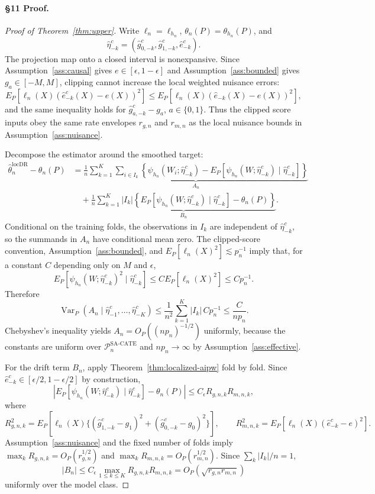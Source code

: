 \paragraph{\S11 Proof.}
\begin{proof}[Proof of Theorem~\ref{thm:upper}]
Write $\ell_n=\ell_{h_n}$, $\theta_n(P)=\theta_{h_n}(P)$, and
\[
  \hat\eta^c_{-k}=(\hat g^c_{0,-k},\hat g^c_{1,-k},\hat e^c_{-k}).
\]
The projection map onto a closed interval is nonexpansive.  Since Assumption~\ref{ass:causal} gives
$e\in[\epsilon,1-\epsilon]$ and Assumption~\ref{ass:bounded} gives $g_a\in[-M,M]$, clipping cannot
increase the local weighted nuisance errors:
\[
  E_P[\ell_n(X)(\hat e^c_{-k}(X)-e(X))^2]
  \le E_P[\ell_n(X)(\hat e_{-k}(X)-e(X))^2],
\]
and the same inequality holds for $\hat g^c_{a,-k}-g_a$, $a\in\{0,1\}$.  Thus the clipped score inputs
obey the same rate envelopes $r_{g,n}$ and $r_{m,n}$ as the local nuisance bounds in
Assumption~\ref{ass:nuisance}.

Decompose the estimator around the smoothed target:
\[
\begin{aligned}
  \hat\theta_n^{\mathrm{locDR}}-\theta_n(P)
  &=
  \underbrace{
  \frac{1}{n}\sum_{k=1}^K\sum_{i\in I_k}
  \left\{\psi_{h_n}(W_i;\hat\eta^c_{-k})
       -E_P[\psi_{h_n}(W;\hat\eta^c_{-k})\mid \hat\eta^c_{-k}]\right\}}_{A_n} \\
  &\quad+
  \underbrace{
  \frac{1}{n}\sum_{k=1}^K |I_k|
  \left\{E_P[\psi_{h_n}(W;\hat\eta^c_{-k})\mid \hat\eta^c_{-k}]-\theta_n(P)\right\}}_{B_n}.
\end{aligned}
\]
Conditional on the training folds, the observations in $I_k$ are independent of
$\hat\eta^c_{-k}$, so the summands in $A_n$ have conditional mean zero.  The clipped-score convention,
Assumption~\ref{ass:bounded}, and $E_P[\ell_n(X)^2]\lesssim p_n^{-1}$ imply that, for a constant $C$
depending only on $M$ and $\epsilon$,
\[
  E_P\!\left[\psi_{h_n}(W;\hat\eta^c_{-k})^2\mid \hat\eta^c_{-k}\right]
  \le C E_P[\ell_n(X)^2]
  \le C p_n^{-1}.
\]
Therefore
\[
  \operatorname{Var}_P(A_n\mid \hat\eta^c_{-1},\ldots,\hat\eta^c_{-K})
  \le
  \frac{1}{n^2}\sum_{k=1}^K |I_k|\,C p_n^{-1}
  \le \frac{C}{n p_n}.
\]
Chebyshev's inequality yields $A_n=O_P((n p_n)^{-1/2})$ uniformly, because the constants are uniform
over $\mathcal{P}_n^{\mathrm{SA\text{-}CATE}}$ and $n p_n\to\infty$ by
Assumption~\ref{ass:effective}.

For the drift term $B_n$, apply Theorem~\ref{thm:localized-aipw} fold by fold.  Since
$\hat e^c_{-k}\in[\epsilon/2,1-\epsilon/2]$ by construction,
\[
  \left|
  E_P[\psi_{h_n}(W;\hat\eta^c_{-k})\mid \hat\eta^c_{-k}]
  -\theta_n(P)
  \right|
  \le
  C_\epsilon R_{g,n,k}R_{m,n,k},
\]
where
\[
  R_{g,n,k}^2
  =
  E_P[\ell_n(X)\{(\hat g^c_{1,-k}-g_1)^2+(\hat g^c_{0,-k}-g_0)^2\}],
  \qquad
  R_{m,n,k}^2
  =
  E_P[\ell_n(X)(\hat e^c_{-k}-e)^2].
\]
Assumption~\ref{ass:nuisance} and the fixed number of folds imply
$\max_k R_{g,n,k}=O_P(r_{g,n}^{1/2})$ and
$\max_k R_{m,n,k}=O_P(r_{m,n}^{1/2})$.  Since $\sum_k |I_k|/n=1$,
\[
  |B_n|
  \le C_\epsilon \max_{1\le k\le K} R_{g,n,k}R_{m,n,k}
  =
  O_P\!\left(\sqrt{r_{g,n}r_{m,n}}\right)
\]
uniformly over the model class.


\end{proof}
